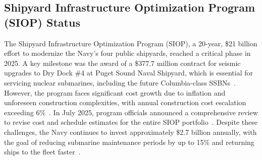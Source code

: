 \documentclass[../main.tex]{subfiles}
\begin{document}
\subsection{Shipyard Infrastructure Optimization Program (SIOP) Status}
The Shipyard Infrastructure Optimization Program (SIOP), a 20-year, \$21 billion effort to modernize the Navy's four public shipyards, reached a critical phase in 2025. A key milestone was the award of a \$377.7 million contract for seismic upgrades to Dry Dock \#4 at Puget Sound Naval Shipyard, which is essential for servicing nuclear submarines, including the future Columbia-class SSBNs~\autocite{kitsapsun-siop-2025}. However, the program faces significant cost growth due to inflation and unforeseen construction complexities, with annual construction cost escalation exceeding 6\%~\autocite{breakingdefense-siop-2025}. In July 2025, program officials announced a comprehensive review to revise cost and schedule estimates for the entire SIOP portfolio~\autocite{breakingdefense-siop-2025}. Despite these challenges, the Navy continues to invest approximately \$2.7 billion annually, with the goal of reducing submarine maintenance periods by up to 15\% and returning ships to the fleet faster~\autocite{breakingdefense-siop-2025}.
\end{document}
